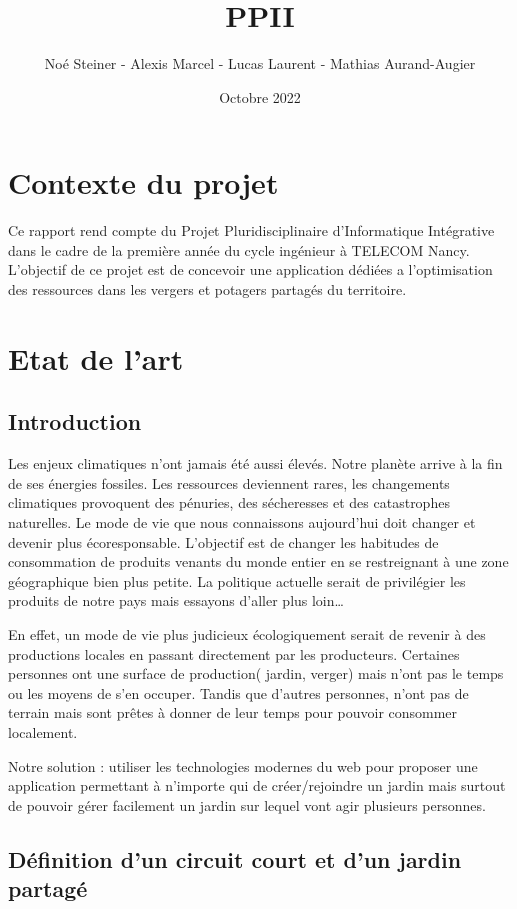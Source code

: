 \documentclass[french,a4paper]{article}
\title{PPII}
\author{Noé Steiner - Alexis Marcel - Lucas Laurent - Mathias Aurand-Augier}
\date{Octobre 2022}
\begin{document}
\maketitle
\newpage
\tableofcontents
\newpage
\section{Contexte du projet}
Ce rapport rend compte du Projet Pluridisciplinaire d’Informatique Intégrative dans le cadre de la première année du cycle ingénieur à TELECOM Nancy.
L’objectif de ce projet est de concevoir une application dédiées a l’optimisation des ressources dans les vergers et potagers partagés du territoire.

\newpage
\section{Etat de l'art}
\subsection{Introduction}
Les enjeux climatiques n’ont jamais été aussi élevés. Notre planète arrive à la fin de ses énergies fossiles. Les ressources deviennent rares, les changements climatiques provoquent des pénuries, des sécheresses et des catastrophes naturelles. Le mode de vie que nous connaissons aujourd’hui doit changer et devenir plus écoresponsable. L’objectif est de changer les habitudes de consommation de produits venants du monde entier en se restreignant à une zone géographique bien plus petite. La politique actuelle serait de privilégier les produits de notre pays mais essayons d’aller plus loin…

En effet, un mode de vie plus judicieux écologiquement serait de revenir à des productions locales en passant directement par les producteurs. Certaines personnes ont une surface de production( jardin, verger) mais n’ont pas le temps ou les moyens de s’en occuper. Tandis que d’autres personnes, n’ont pas de terrain mais sont prêtes à donner de leur temps pour pouvoir consommer localement.

Notre solution : utiliser les technologies modernes du web pour proposer une application permettant à n’importe qui de créer/rejoindre un jardin mais surtout de pouvoir gérer facilement un jardin sur lequel vont agir plusieurs personnes.

\subsection{Définition d’un circuit court et d’un jardin partagé}
\end{document}
